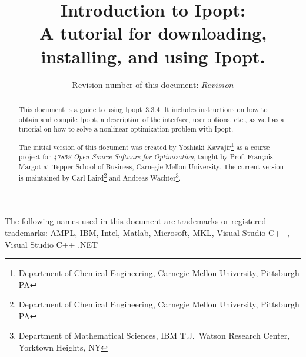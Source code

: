 \documentclass[10pt]{article}
\newcommand{\Ipopt}{{\sc Ipopt}}
\begin{document}
\title{Introduction to \Ipopt:\\
A tutorial for downloading, installing, and using \Ipopt.}

\author{Revision number of this document: $Revision$}

\maketitle

\begin{abstract}
  This document is a guide to using \Ipopt\ 3.3.4.  It includes
  instructions on how to obtain and compile \Ipopt, a description of
  the interface, user options, etc., as well as a tutorial on how to
  solve a nonlinear optimization problem with \Ipopt.

  The initial version of this document was created by
  Yoshiaki Kawajir\footnote{Department of Chemical Engineering,
    Carnegie Mellon University, Pittsburgh PA} as a course project for
  \textit{47852 Open Source Software for Optimization}, taught by
  Prof. Fran\c cois Margot at Tepper School of Business, Carnegie
  Mellon University.  The current version is maintained by Carl
  Laird\footnote{Department of Chemical Engineering, Carnegie Mellon
    University, Pittsburgh PA} and Andreas
  W\"achter\footnote{Department of Mathematical Sciences, IBM T.J.\
    Watson Research Center, Yorktown Heights, NY}.
\end{abstract}

\tableofcontents

\vspace{\baselineskip}
\begin{small}
\noindent
The following names used in this document are trademarks or registered
trademarks: AMPL, IBM, Intel, Matlab, Microsoft, MKL, Visual Studio C++,
Visual Studio C++ .NET
\end{small}
\end{document}
